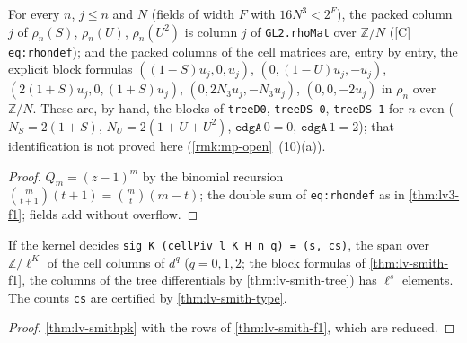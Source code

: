 \begin{theorem}\label{thm:lv-smith-f1}
  \leanok
  For every $n$, $j\le n$ and $N$ (fields of width $F$ with $16N^3<2^F$), the packed column $j$ of $\rho_n(S)$, $\rho_n(U)$,
  $\rho_n(U^2)$ is column $j$ of \texttt{GL2.rhoMat} over $\mathbb Z/N$ ([C] \texttt{eq:rhondef}); and the packed columns of the cell
  matrices are, entry by entry, the explicit block formulas $((1-S)u_j,0,u_j)$, $(0,(1-U)u_j,-u_j)$, $(2(1+S)u_j,0,(1+S)u_j)$,
  $(0,2N_3u_j,-N_3u_j)$, $(0,0,-2u_j)$ in $\rho_n$ over $\mathbb Z/N$.  These are, by hand, the blocks of \texttt{treeD0},
  \texttt{treeDS 0}, \texttt{treeDS 1} for $n$ even ($N_S=2(1+S)$, $N_U=2(1+U+U^2)$, $\texttt{edgA}\,0=0$, $\texttt{edgA}\,1=2$);
  that identification is not proved here (\ref{rmk:mp-open}~(10)(a)).
\end{theorem}
\begin{proof}
  \leanok
  $Q_m=(z-1)^m$ by the binomial recursion $\binom m{t+1}(t+1)=\binom mt(m-t)$; the double sum of \texttt{eq:rhondef} as in
  \ref{thm:lv3-f1}; fields add without overflow.
\end{proof}

\begin{theorem}\label{thm:lv-smith-cell}
  \leanok
  If the kernel decides \texttt{sig K (cellPiv l K H n q) = (s, cs)}, the span over $\mathbb Z/\ell^K$ of the cell columns of $d^q$
  ($q=0,1,2$; the block formulas of \ref{thm:lv-smith-f1}, the columns of the tree differentials by \ref{thm:lv-smith-tree}) has
  $\ell^s$ elements.  The counts \texttt{cs} are certified by \ref{thm:lv-smith-type}.
\end{theorem}
\begin{proof}
  \leanok
  \ref{thm:lv-smithpk} with the rows of \ref{thm:lv-smith-f1}, which are reduced.
\end{proof}

